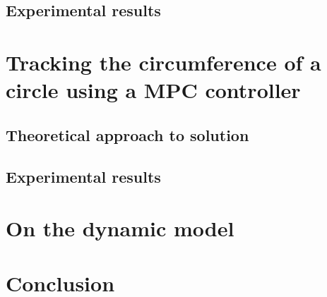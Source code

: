 \documentclass[a4paper,12pt,oneside,onecolumn]{article} %
\begin{document}
    \subsection{Experimental results}
      

  \newpage

  \section{Tracking the circumference of a circle using a MPC controller}

    \subsection{Theoretical approach to solution}
      

    \subsection{Experimental results}
      

  \newpage

  \section{On the dynamic model}
    

  \newpage

  \section{Conclusion}
    
\end{document}
